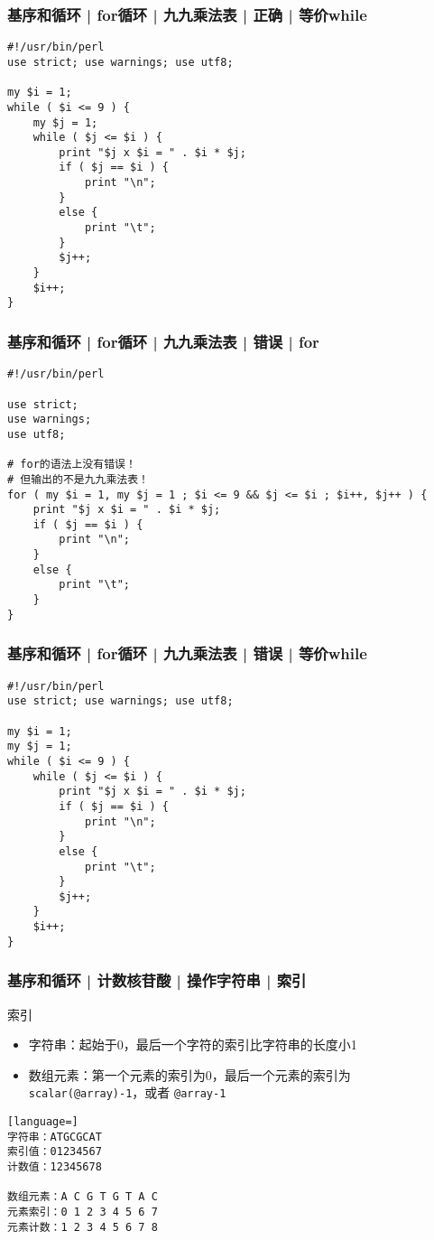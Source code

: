 \begin{frame}[fragile]
  \frametitle{基序和循环 | for循环 | 九九乘法表 | 正确 | 等价while}
  \vspace{-0.5em}
\begin{lstlisting}[basicstyle=\small\tt,numberstyle=\footnotesize]
#!/usr/bin/perl 
use strict; use warnings; use utf8;

my $i = 1;
while ( $i <= 9 ) {
    my $j = 1;
    while ( $j <= $i ) {
        print "$j x $i = " . $i * $j;
        if ( $j == $i ) {
            print "\n";
        }
        else {
            print "\t";
        }
        $j++;
    }
    $i++;
}
\end{lstlisting}
\end{frame}

\begin{frame}[fragile]
  \frametitle{基序和循环 | for循环 | 九九乘法表 | 错误 | for}
  \vspace{-0.5em}
\begin{lstlisting}[basicstyle=\small\tt,numberstyle=\footnotesize]
#!/usr/bin/perl 

use strict;
use warnings;
use utf8;

# for的语法上没有错误！
# 但输出的不是九九乘法表！
for ( my $i = 1, my $j = 1 ; $i <= 9 && $j <= $i ; $i++, $j++ ) {
    print "$j x $i = " . $i * $j;
    if ( $j == $i ) {
        print "\n";
    }
    else {
        print "\t";
    }
}
\end{lstlisting}
\end{frame}

\begin{frame}[fragile]
  \frametitle{基序和循环 | for循环 | 九九乘法表 | 错误 | 等价while}
  \vspace{-0.5em}
\begin{lstlisting}[basicstyle=\small\tt,numberstyle=\footnotesize]
#!/usr/bin/perl 
use strict; use warnings; use utf8;

my $i = 1;
my $j = 1;
while ( $i <= 9 ) {
    while ( $j <= $i ) {
        print "$j x $i = " . $i * $j;
        if ( $j == $i ) {
            print "\n";
        }
        else {
            print "\t";
        }
        $j++;
    }
    $i++;
}
\end{lstlisting}
\end{frame}


\begin{frame}[fragile]
  \frametitle{基序和循环 | 计数核苷酸 | 操作字符串 | \alert{索引}}
  \begin{block}{索引}
  \begin{itemize}
    \item 字符串：起始于0，最后一个字符的索引比字符串的长度小1
    \item 数组元素：第一个元素的索引为0，最后一个元素的索引为 \verb|scalar(@array)-1|，或者 \verb|@array-1|
  \end{itemize}
  \end{block}
  \pause
\begin{lstlisting}[language=]
字符串：ATGCGCAT
索引值：01234567
计数值：12345678

数组元素：A C G T G T A C
元素索引：0 1 2 3 4 5 6 7
元素计数：1 2 3 4 5 6 7 8
\end{lstlisting}
\end{frame}

